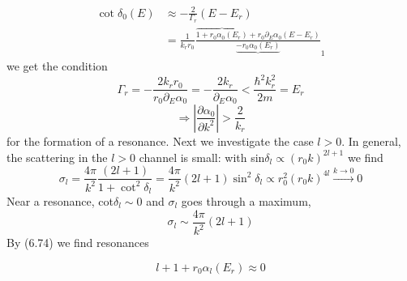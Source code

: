 \begin{equation}
\begin{aligned} \cot \delta_{0}(E) & \approx-\frac{2}{\Gamma_{r}}\left(E-E_{r}\right) \\ &=\frac{1}{k_{r} r_{0}} \frac{\overbrace{1+r_{0} \alpha_{0}\left(E_{r}\right)}+r_{0} \partial_{E} \alpha_{0}\left(E-E_{r}\right)}{\underbrace{-r_{0} \alpha_{0}\left(E_{r}\right)}}_{1} \end{aligned}
\end{equation}
we get the condition
\begin{equation}
    \Gamma_{r}=-\frac{2 k_{r} r_{0}}{r_{0} \partial_{E} \alpha_{0}}=-\frac{2 k_{r}}{\partial_{E} \alpha_{0}}<\frac{\hbar^{2} k_{r}^{2}}{2 m}=E_{r}
    \end{equation}
\begin{equation}
    \Rightarrow\left|\frac{\partial \alpha_{0}}{\partial k^{2}}\right|>\frac{2}{k_{r}}
    \end{equation}
for the formation of a resonance.
Next we investigate the case $l> 0$. In general, the scattering in the $l> 0$ channel is small: with sin$ \delta_l \propto (r_0k)^{2l + 1}$ we find
\begin{equation}
    \sigma_{l}=\frac{4 \pi}{k^{2}} \frac{(2 l+1)}{1+\cot ^{2} \delta_{l}}=\frac{4 \pi}{k^{2}}(2 l+1) \sin ^{2} \delta_{l} \propto r_{0}^{2}\left(r_{0} k\right)^{4 l} \stackrel{k \rightarrow 0}{\longrightarrow} 0
    \end{equation}
Near a resonance, cot$ \delta_l \sim 0$ and $\sigma_l$ goes through a maximum,
\begin{equation}
    \sigma_{l} \sim \frac{4 \pi}{k^{2}}(2 l+1)
    \end{equation}
By (6.74) we find resonances

\begin{equation}
    l+1+r_{0} \alpha_{l}\left(E_{r}\right) \approx 0
    \end{equation}

